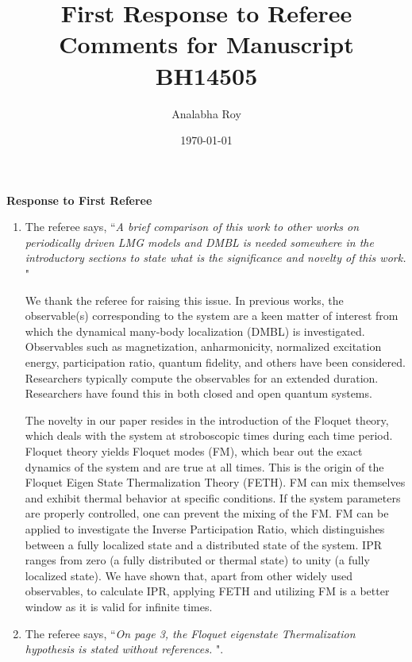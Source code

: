 \documentclass[aps,prb,reprint,showpacs,floatfix,superscriptaddress, onecolumn, nofootinbib, 9pt]{revtex4-2}
\newcommand{\ar}[1]{{\color{blue}#1}} %
\begin{document}

\title{First Response to Referee Comments for Manuscript BH14505}
\author{Analabha Roy}
\date{\today}

\maketitle

\vspace{1em}

\noindent \textbf{Response to First Referee}

\begin{enumerate}
\item The referee says, ``\textit{A brief comparison of this work to other works on periodically driven LMG models and DMBL is needed somewhere in the introductory sections to state what is the significance and novelty of this work. }"\\

\ar{
We thank the referee for raising this issue. In previous works, the observable(s) corresponding to the system are a keen matter of interest from which the dynamical many-body localization (DMBL) is investigated. Observables such as magnetization, anharmonicity, normalized excitation energy, participation ratio, quantum fidelity, and others have been considered. Researchers typically compute the observables for an extended duration. Researchers have found this in both closed and open quantum systems.

The novelty in our paper resides in the introduction of the Floquet theory, which deals with the system at stroboscopic times during each time period. Floquet theory yields Floquet modes (FM), which bear out the exact dynamics of the system and are true at all times. This is the origin of the Floquet Eigen State Thermalization Theory (FETH). FM can mix themselves and exhibit thermal behavior at specific conditions. If the system parameters are properly controlled, one can prevent the mixing of the FM. FM can be applied to investigate the Inverse Participation Ratio, which distinguishes between a fully localized state and a distributed state of the system. IPR ranges from zero (a fully distributed or thermal state) to unity (a fully localized state). We have shown that, apart from other widely used observables, to calculate IPR, applying FETH and utilizing FM is a better window as it is valid for infinite times.
}
\item The referee says, ``\textit{On page 3, the Floquet eigenstate Thermalization hypothesis is stated without references. }".\\


\end{enumerate}
\end{document}
